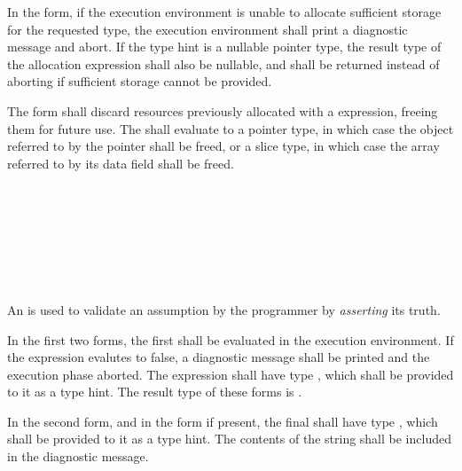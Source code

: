 

\specsubsubitem
In the  form, if the execution environment is unable to
allocate sufficient storage for the requested type, the execution environment
shall print a diagnostic message and abort. If the type hint is a nullable
pointer type, the result type of the allocation expression shall also be
nullable, and  shall be returned instead of aborting if
sufficient storage cannot be provided.

\specsubsubitem
The  form shall discard resources previously allocated with a
 expression, freeing them for future use. The
 shall evaluate to a pointer type, in which case the
object referred to by the pointer shall be freed, or a slice type, in which
case the array referred to by its data field shall be freed.


\begin{grammar}
 \\
	 \terminal{(}  \terminal{)} \\
	 \terminal{(}  \terminal{,}  \terminal{)} \\
	 \terminal{(}  \terminal{)} \\

 \\
	  \\
\end{grammar}

\specsubsubitem
An  is used to validate an assumption by the
programmer by \textit{asserting} its truth.

\specsubsubitem
In the first two forms, the first  shall be evaluated in
the execution environment. If the expression evalutes to false, a diagnostic
message shall be printed and the execution phase aborted. The expression shall
have type , which shall be provided to it as a type hint. The
result type of these forms is .

\specsubsubitem
In the second  form, and in the  form if
present, the final  shall have type ,
which shall be provided to it as a type hint. The contents of the string shall
be included in the diagnostic message.

